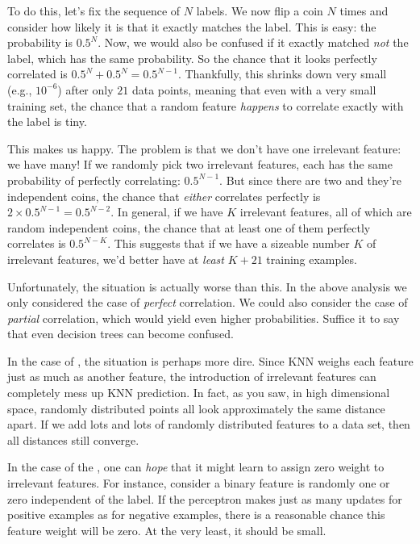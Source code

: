 To do this, let's fix the sequence of $N$ labels.  We now flip a coin
$N$ times and consider how likely it is that it exactly matches the
label.  This is easy: the probability is $0.5^N$.  Now, we would also
be confused if it exactly matched \emph{not} the label, which has the
same probability.  So the chance that it looks perfectly correlated is
$0.5^N + 0.5^N = 0.5^{N-1}$.  Thankfully, this shrinks down very small
(e.g., $10^{-6}$) after only $21$ data points, meaning that even with a very small training set, the chance that a random feature \emph{happens} to correlate exactly with the label is tiny.

This makes us happy.  The problem is that we don't have one irrelevant
feature: we have many! If we randomly pick
two irrelevant features, each has the same probability of
perfectly correlating: $0.5^{N-1}$.  But since there are two and
they're independent coins, the chance that \emph{either} correlates
perfectly is $2 \times 0.5^{N-1} = 0.5^{N-2}$.  In general, if we have
$K$ irrelevant features, all of which are random independent coins,
the chance that at least one of them perfectly correlates is
$0.5^{N-K}$.  This suggests that if we have a sizeable number $K$ of
irrelevant features, we'd better have at \emph{least} $K+21$ training
examples.

Unfortunately, the situation is actually worse than this.  In the
above analysis we only considered the case of \emph{perfect}
correlation.  We could also consider the case of \emph{partial}
correlation, which would yield even higher probabilities.  
Suffice it to say that even
decision trees can become confused.


In the case of , the situation is
perhaps more dire.  Since KNN weighs each feature just as much as
another feature, the introduction of irrelevant features can
completely mess up KNN prediction.  In fact, as you saw, in high
dimensional space, randomly distributed points all look approximately
the same distance apart.  If we add lots and lots of randomly
distributed features to a data set, then all distances still
converge.

In the case of the , one can \emph{hope} that it
might learn to assign zero weight to irrelevant features.  For
instance, consider a binary feature is randomly one or zero
independent of the label.  If the perceptron makes just as many
updates for positive examples as for negative examples, there is a
reasonable chance this feature weight will be zero.  At the very
least, it should be small.

